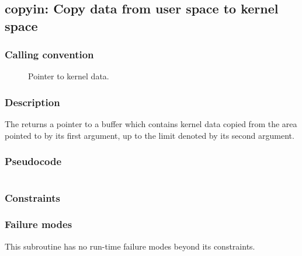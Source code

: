 \clearpage
{}
{}
\label{subr:copyin}
\subsection*{copyin: Copy data from user space to kernel space}

\subsubsection*{Calling convention}

\begin{description}
\item[] Pointer to kernel data.
\end{description}

\subsubsection*{Description}

The  returns a pointer to a buffer which contains
kernel data copied from the area pointed to by its first argument, up
to the limit denoted by its second argument.
\subsubsection*{Pseudocode}

\begin{verbatim}
\end{verbatim}

\subsubsection*{Constraints}

\subsubsection*{Failure modes}

This subroutine has no run-time failure modes beyond its constraints.
